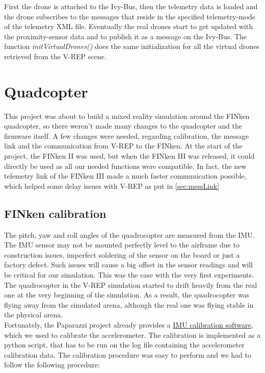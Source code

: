 First the drone is attached to the Ivy-Bus, then the telemetry data is loaded and the drone subscribes to the messages that reside in the specified telemetry-mode of the telemetry XML file. Eventually the real drones start to get updated with the proximity-sensor data and to publish it as a message on the Ivy-Bus. The function \textit{initVirtualDrones()} does the same initialization for all the virtual drones retrieved from the V-REP scene.



\section{Quadcopter}
\label{sec:finken}
This project was about to build a mixed reality simulation around the FINken quadcopter, so there weren't made many changes to the quadcopter and the firmware itself. A few changes were needed, regarding calibration, the message link and the communication from V-REP to the FINken. At the start of the project, the FINken II was used, but when the FINken III was released, it could directly be used as all our needed functions were compatible. In fact, the new telemetry link of the FINken III made a much faster communication possible, which helped some delay issues with V-REP as put in \ref{sec:messLink}
\subsection{FINken calibration}

The pitch, yaw and roll angles of the quadrocopter are measured from the \gls{IMU}. The \gls{IMU} sensor may not be mounted perfectly level to the airframe due to construction issues, imperfect soldering of the sensor on the board or just a factory defect. Such issues will cause a big offset in the sensor readings and will be critical for our simulation.
This was the case with the very first experiments. 
The quadrocopter in the V-REP simulation started to drift heavily from the real one at the very beginning of the simulation. 
As a result, the quadrocopter was flying away from the simulated arena, although the real one was flying stable in the physical arena.\\

Fortunately, the Paparazzi project already provides a \href{http://wiki.paparazziuav.org/wiki/ImuCalibration}{IMU calibration software}, which we used to calibrate the accelerometer. 
The calibration is implemented as a python script, that has to be run on the log file containing the accelerometer calibration data. 
The calibration procedure was easy to perform and we had to follow the following procedure:

